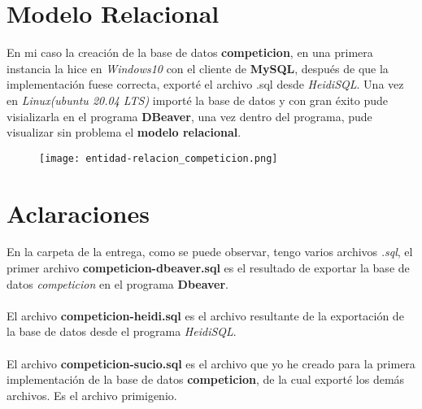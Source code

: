 \documentclass{article}
\begin{document}
\newpage
  \section{Modelo Relacional}
    En mi caso la creación de la base de datos \textbf{competicion}, en una primera instancia la hice en \textit{Windows10} con el cliente de \textbf{MySQL}, 
    después de que la implementación fuese correcta, exporté el archivo .sql desde \textit{HeidiSQL}. Una vez en \textit{Linux(ubuntu 20.04 LTS)} importé la 
    base de datos y con gran éxito pude visializarla en el programa \textbf{DBeaver}, una vez dentro del programa, pude visualizar sin problema el \textbf{modelo relacional}.

    \begin{figure}[h]
      \centering
      \texttt{[image: entidad-relacion\_competicion.png]}
    \end{figure}

\newpage
  \section{Aclaraciones}
    En la carpeta de la entrega, como se puede observar, tengo varios archivos \textit{.sql}, el primer archivo \textbf{competicion-dbeaver.sql} es el resultado de exportar la base de datos
    \textit{competicion} en el programa \textbf{Dbeaver}.
    \\\\
    El archivo \textbf{competicion-heidi.sql} es el archivo resultante de la exportación de la base de datos desde el programa \textit{HeidiSQL}.
    \\\\
    El archivo \textbf{competicion-sucio.sql} es el archivo que yo he creado para la primera implementación de la base de datos \textbf{competicion}, de la cual exporté los demás archivos. Es el archivo primigenio.
\end{document}

